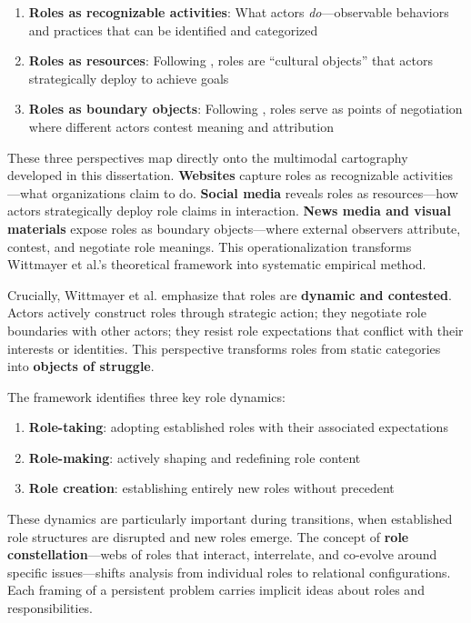 \documentclass[../main.tex]{subfiles}
\begin{document}
\begin{enumerate}[nosep]
\item \textbf{Roles as recognizable activities}: What actors \emph{do}---observable behaviors and practices that can be identified and categorized
\item \textbf{Roles as resources}: Following \textcite{callero1994limits}, roles are ``cultural objects'' that actors strategically deploy to achieve goals
\item \textbf{Roles as boundary objects}: Following \textcite{simpson2008role}, roles serve as points of negotiation where different actors contest meaning and attribution
\end{enumerate}

These three perspectives map directly onto the multimodal cartography developed in this dissertation. \textbf{Websites} capture roles as recognizable activities---what organizations claim to do. \textbf{Social media} reveals roles as resources---how actors strategically deploy role claims in interaction. \textbf{News media and visual materials} expose roles as boundary objects---where external observers attribute, contest, and negotiate role meanings. This operationalization transforms Wittmayer et al.'s theoretical framework into systematic empirical method.

Crucially, Wittmayer et al. emphasize that roles are \textbf{dynamic and contested}. Actors actively construct roles through strategic action; they negotiate role boundaries with other actors; they resist role expectations that conflict with their interests or identities. This perspective transforms roles from static categories into \textbf{objects of struggle}.

The framework identifies three key role dynamics:

\begin{enumerate}[nosep]
\item \textbf{Role-taking}: adopting established roles with their associated expectations
\item \textbf{Role-making}: actively shaping and redefining role content
\item \textbf{Role creation}: establishing entirely new roles without precedent
\end{enumerate}

These dynamics are particularly important during transitions, when established role structures are disrupted and new roles emerge. The concept of \textbf{role constellation}---webs of roles that interact, interrelate, and co-evolve around specific issues---shifts analysis from individual roles to relational configurations. Each framing of a persistent problem carries implicit ideas about roles and responsibilities.
\end{document}
